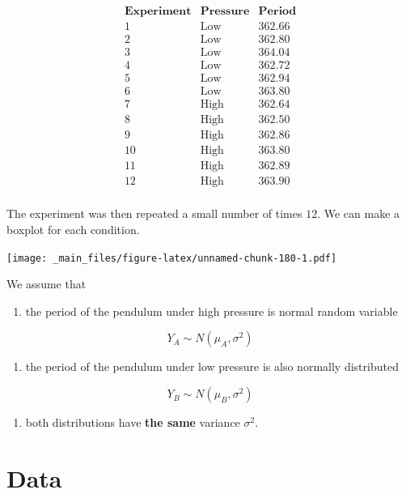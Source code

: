 \documentclass[
]{book}
\providecommand{\tightlist}{%
  \setlength{\itemsep}{0pt}\setlength{\parskip}{0pt}}
\begin{document}
\[
\begin{array}{ccc}
\mathbf{Experiment} & \mathbf{Pressure} & \mathbf{Period} \\ 
1 &      \text{Low}& 362.66\\
2 &      \text{Low}& 362.80\\
3 &      \text{Low}& 364.04\\
4 &      \text{Low}& 362.72\\
5 &      \text{Low}& 362.94\\
6 &      \text{Low}& 363.80\\
7 &     \text{High}& 362.64\\
8 &     \text{High}& 362.50\\
9 &     \text{High}& 362.86\\
10&     \text{High}& 363.80\\
11&     \text{High}& 362.89\\
12&     \text{High}& 363.90\\
\end{array}
\]

The experiment was then repeated a small number of times \(12\). We can make a boxplot for each condition.

\texttt{[image: \_main\_files/figure-latex/unnamed-chunk-180-1.pdf]}

We assume that

\begin{enumerate}
\def\labelenumi{\arabic{enumi}.}
\tightlist
\item
  the period of the pendulum under high pressure is normal random variable
\end{enumerate}

\[Y_A \sim N(\mu_A, \sigma^2)\]

\begin{enumerate}
\def\labelenumi{\arabic{enumi}.}
\setcounter{enumi}{1}
\tightlist
\item
  the period of the pendulum under low pressure is also normally distributed
\end{enumerate}

\[Y_B \sim N(\mu_B, \sigma^2)\]

\begin{enumerate}
\def\labelenumi{\arabic{enumi}.}
\setcounter{enumi}{2}
\tightlist
\item
  both distributions have \textbf{the same} variance \(\sigma^2\).
\end{enumerate}

\hypertarget{data-2}{%
\section{Data}\label{data-2}}
\end{document}

